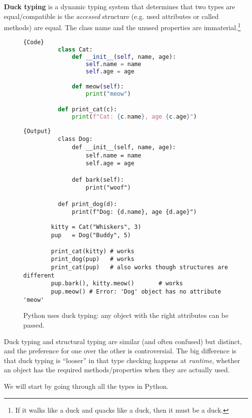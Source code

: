   \begin{definition}
    \textbf{Duck typing} is a dynamic typing system that determines that two types are equal/compatible is the \textit{accessed} structure (e.g. used attributes or called methods) are equal. The class name and the unused properties are immaterial.\footnote{If it walks like a duck and quacks like a duck, then it must be a duck.} 

    \begin{figure}[H]
      \centering 
      \noindent\begin{minipage}{.5\textwidth}
        \begin{lstlisting}[language=python]{Code}
          class Cat:
              def __init__(self, name, age):
                  self.name = name
                  self.age = age 

              def meow(self): 
                  print("meow")

          def print_cat(c):
              print(f"Cat: {c.name}, age {c.age}")
        \end{lstlisting}
      \end{minipage}
      \hfill
      \begin{minipage}{.49\textwidth}
        \begin{lstlisting}[]{Output}
          class Dog:
              def __init__(self, name, age):
                  self.name = name
                  self.age = age

              def bark(self): 
                  print("woof")

          def print_dog(d):
              print(f"Dog: {d.name}, age {d.age}")
        \end{lstlisting}
      \end{minipage}

      \begin{lstlisting}
        kitty = Cat("Whiskers", 3)
        pup   = Dog("Buddy", 5)

        print_cat(kitty) # works
        print_dog(pup)   # works
        print_cat(pup)   # also works though structures are different
        pup.bark(), kitty.meow()       # works  
        pup.meow() # Error: 'Dog' object has no attribute 'meow'
      \end{lstlisting}
      \caption{Python uses duck typing: any object with the right attributes can be passed.} 
      \label{fig:python_duck}
    \end{figure}
  \end{definition} 

  Duck typing and structural typing are similar (and often confused) but distinct, and the preference for one over the other is controversial. The big difference is that duck typing is ``looser'' in that type checking happens at \textit{runtime}, whether an object has the required methods/properties when they are actually used. 

  We will start by going through all the types in Python. 

